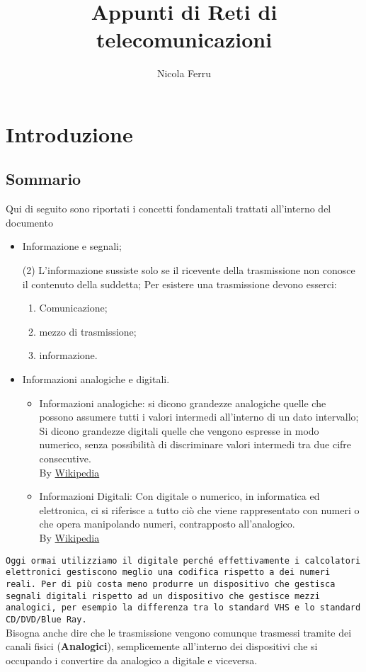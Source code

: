 \documentclass{book}
\title{Appunti di Reti di telecomunicazioni}
\author{Nicola Ferru}
\date{}
\begin{document}
\maketitle
\tableofcontents
\listoftables
\listoffigures
\chapter{Introduzione}
\section{Sommario}
Qui di seguito sono riportati i concetti fondamentali trattati all'interno
del documento
\begin{itemize}
	\item Informazione e segnali;
		\begin{tasks}(2)
			\task L'informazione sussiste solo se il ricevente della
			trasmissione non conosce il contenuto della suddetta;
			\task Per esistere una trasmissione devono esserci:
				\begin{enumerate}
					\item Comunicazione;
					\item mezzo di trasmissione;
					\item informazione.
				\end{enumerate}
		\end{tasks}
	\item Informazioni analogiche e digitali.
		\begin{itemize}
			\item Informazioni analogiche: si dicono grandezze analogiche
				quelle che possono assumere tutti i valori intermedi
				all'interno di un dato intervallo; Si dicono grandezze digitali
				quelle che vengono espresse in modo numerico, senza possibilità
				di discriminare valori intermedi tra due cifre consecutive.\\
				By \href{https://it.wikipedia.org/wiki/Analogico}{Wikipedia}
			\item Informazioni Digitali: Con digitale o numerico, in 
				informatica ed elettronica, ci si riferisce a tutto ciò che
				viene rappresentato con numeri o che opera manipolando numeri,
				contrapposto all'analogico.\\
				By
				\href{https://it.wikipedia.org/wiki/Digitale_(informatica)}{Wikipedia}
		\end{itemize}
\end{itemize}
\texttt{Oggi ormai utilizziamo il digitale perché effettivamente i calcolatori
elettronici gestiscono meglio una codifica rispetto a dei numeri reali. Per di
più costa meno produrre un dispositivo che gestisca segnali digitali rispetto
ad un dispositivo che gestisce mezzi analogici, per esempio la differenza tra
lo standard VHS e lo standard CD/DVD/Blue Ray.}\\
Bisogna anche dire che le trasmissione vengono comunque trasmessi tramite dei
canali fisici ({\bf Analogici}), semplicemente all'interno dei dispositivi che si
occupando i convertire da analogico a digitale e viceversa.
\end{document}

